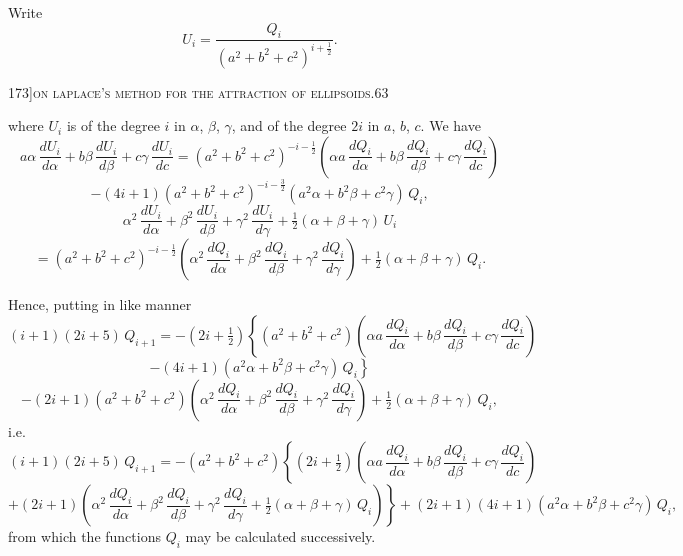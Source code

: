 \documentclass[11pt]{article}
\begin{document}
Write
\[
U_{i} = \frac{Q_{i}}{(a^{2} + b^{2} + c^{2})^{i + \tfrac{1}{2}}}.
\]

\newpage

\begin{center}
\small 173]\hfill\textsc{on laplace's method for the attraction of ellipsoids.}\hfill\textsc{63}
\end{center}

\medskip

\noindent where $U_{i}$ is of the degree $i$ in $\alpha$, $\beta$, $\gamma$, and of the degree $2i$ in $a$, $b$, $c$. We have
\[
a\alpha\,\frac{dU_{i}}{d\alpha} + b\beta\,\frac{dU_{i}}{d\beta} + c\gamma\,\frac{dU_{i}}{dc} = (a^{2} + b^{2} + c^{2})^{-i - \tfrac{1}{2}}\left(\alpha a\,\frac{dQ_{i}}{d\alpha} + b\beta\,\frac{dQ_{i}}{d\beta} + c\gamma\,\frac{dQ_{i}}{dc}\right)
\]
\[
- (4i + 1)(a^{2} + b^{2} + c^{2})^{-i - \tfrac{3}{2}}(a^{2}\alpha + b^{2}\beta + c^{2}\gamma)\,Q_{i},
\]
\[
\alpha^{2}\,\frac{dU_{i}}{d\alpha} + \beta^{2}\,\frac{dU_{i}}{d\beta} + \gamma^{2}\,\frac{dU_{i}}{d\gamma} + \tfrac{1}{2}(\alpha + \beta + \gamma)\,U_{i}
\]
\[
= (a^{2} + b^{2} + c^{2})^{-i - \tfrac{1}{2}}\left(\alpha^{2}\,\frac{dQ_{i}}{d\alpha} + \beta^{2}\,\frac{dQ_{i}}{d\beta} + \gamma^{2}\,\frac{dQ_{i}}{d\gamma}\right) + \tfrac{1}{2}(\alpha + \beta + \gamma)\,Q_{i}.
\]

Hence, putting in like manner
\[
(i + 1)(2i + 5)\,Q_{i+1} = - (2i + \tfrac{1}{2})\left\{(a^{2} + b^{2} + c^{2})\left(\alpha a\,\frac{dQ_{i}}{d\alpha} + b\beta\,\frac{dQ_{i}}{d\beta} + c\gamma\,\frac{dQ_{i}}{dc}\right)\right.
\]
\[
\left. - (4i + 1)(a^{2}\alpha + b^{2}\beta + c^{2}\gamma)\,Q_{i}\right\}
\]
\[
- (2i + 1)(a^{2} + b^{2} + c^{2})\left(\alpha^{2}\,\frac{dQ_{i}}{d\alpha} + \beta^{2}\,\frac{dQ_{i}}{d\beta} + \gamma^{2}\,\frac{dQ_{i}}{d\gamma}\right) + \tfrac{1}{2}(\alpha + \beta + \gamma)\,Q_{i},
\]
i.e.
\[
(i + 1)(2i + 5)\,Q_{i+1} = - (a^{2} + b^{2} + c^{2})\left\{(2i + \tfrac{1}{2})\left(\alpha a\,\frac{dQ_{i}}{d\alpha} + b\beta\,\frac{dQ_{i}}{d\beta} + c\gamma\,\frac{dQ_{i}}{dc}\right)\right.
\]
\[
\left. + (2i + 1)\left(\alpha^{2}\,\frac{dQ_{i}}{d\alpha} + \beta^{2}\,\frac{dQ_{i}}{d\beta} + \gamma^{2}\,\frac{dQ_{i}}{d\gamma} + \tfrac{1}{2}(\alpha + \beta + \gamma)\,Q_{i}\right)\right\} + (2i + 1)(4i + 1)(a^{2}\alpha + b^{2}\beta + c^{2}\gamma)\,Q_{i},
\]
from which the functions $Q_{i}$ may be calculated successively.
\end{document}
